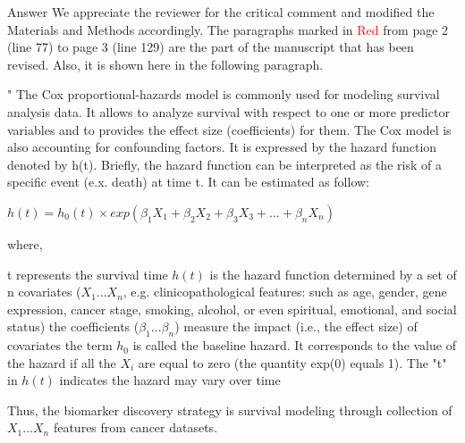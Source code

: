 \documentclass[preprint,12pt]{elsarticle}
\newenvironment{MyColorPar}[1]{%
    \leavevmode\color{#1}\ignorespaces%
}{%
}%
\begin{document}
%
\begin{MyColorPar}{blue}
Answer
We appreciate the reviewer for the critical comment and modified the Materials and Methods accordingly.
The paragraphs marked in \textcolor{red}{Red} from page 2 (line 77) to page 3 (line 129) are the part of the manuscript that has been revised. Also, it is shown here in the following paragraph.
\\[0.3cm]

\begin{MyColorPar}{red}
"
The Cox proportional-hazards model\cite{Cox1972}\cite{Andersen1982} is commonly used for modeling survival analysis data. It allows to analyze survival with respect to one or more predictor variables and to provides the effect size (coefficients) for them\cite{Bradburn2003b}. %
The Cox model is also accounting for confounding factors\cite{Magen2019}.
It is expressed by the hazard function denoted by h(t). Briefly, the hazard function can be interpreted as the risk of a specific event (e.x. death) at time t. It can be estimated as follow:

\begin{flushleft}

$h(t) = h_0(t) \times exp(\beta_1 X_1 + \beta_2 X_2 + \beta_3 X_3 + ... + \beta_n X_n)$\\[0.3cm]
\end{flushleft}
where,\\
\begin{outline} %
\1 t represents the survival time
\1 $h(t)$ is the hazard function determined by a set of n covariates ($X_1...X_n$, e.g. clinicopathological features: such as age, gender, gene expression, cancer stage, smoking, alcohol, or even spiritual, emotional, and social status)
\1 the coefficients ($\beta_1...\beta_n$) measure the impact (i.e., the effect size) of covariates
\1 the term $h_0$ is called the baseline hazard. It corresponds to the value of the hazard if all the $X_i$ are equal to zero (the quantity exp(0) equals 1). The "t" in $h(t)$ indicates the hazard may vary over time
\end{outline}

Thus, the biomarker discovery strategy is survival modeling through collection of $X_1...X_n$ features from cancer datasets.\\[1cm]


\end{MyColorPar}
\end{MyColorPar}
\end{document}
